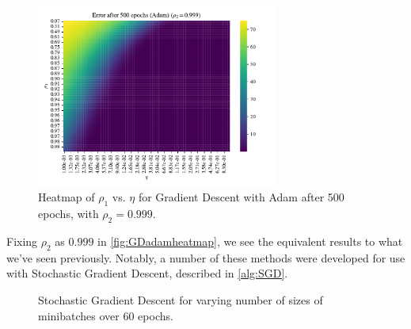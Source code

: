 \documentclass{article}
\theoremstyle{definition}
\begin{document}
\begin{figure}[H]%
    \centering
    \includegraphics[width=8cm]{Project2/figures/polynomial_grad/OLS_autodiff/adam_momentum_heatmap_eta_rho.pdf}
    \caption{Heatmap of $\rho_1$ vs. $\eta$ for Gradient Descent with Adam after 500 epochs, with $\rho_2 = 0.999$.}
    \label{fig:GDadamheatmap}
\end{figure}

Fixing $\rho_2$ as $0.999$ in \autoref{fig:GDadamheatmap}, we see the equivalent results to what we've seen previously. Notably, a number of these methods were developed for use with Stochastic Gradient Descent, described in \autoref{alg:SGD}.


\begin{figure}[H]%
    \centering
    \qquad
    \caption{Stochastic Gradient Descent for varying number of sizes of minibatches over 60 epochs.}%
    \label{fig:SGDconstant}%
\end{figure}
\end{document}
